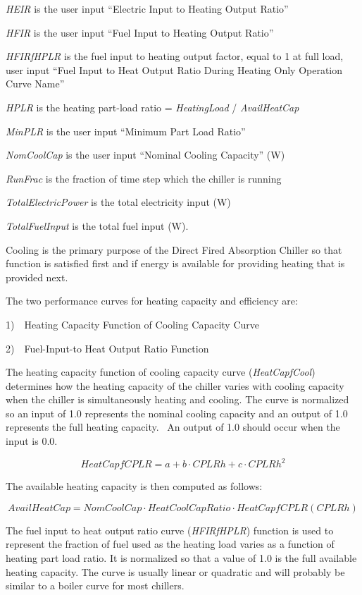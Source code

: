 \emph{HEIR} is the user input ``Electric Input to Heating Output Ratio''

\emph{HFIR} is the user input ``Fuel Input to Heating Output Ratio''

\emph{HFIRfHPLR} is the fuel input to heating output factor, equal to 1 at full load, user input ``Fuel Input to Heat Output Ratio During Heating Only Operation Curve Name''

\emph{HPLR} is the heating part-load ratio = \emph{HeatingLoad} / \emph{AvailHeatCap}

\emph{MinPLR} is the user input ``Minimum Part Load Ratio''

\emph{NomCoolCap} is the user input ``Nominal Cooling Capacity'' (W)

\emph{RunFrac} is the fraction of time step which the chiller is running

\emph{TotalElectricPower} is the total electricity input (W)

\emph{TotalFuelInput} is the total fuel input (W).

Cooling is the primary purpose of the Direct Fired Absorption Chiller so that function is satisfied first and if energy is available for providing heating that is provided next.

The two performance curves for heating capacity and efficiency are:

1)~~Heating Capacity Function of Cooling Capacity Curve

2)~~Fuel-Input-to Heat Output Ratio Function

The heating capacity function of cooling capacity curve (\emph{HeatCapfCool}) determines how the heating capacity of the chiller varies with cooling capacity when the chiller is simultaneously heating and cooling. The curve is normalized so an input of 1.0 represents the nominal cooling capacity and an output of 1.0 represents the full heating capacity.~ An output of 1.0 should occur when the input is 0.0.

\begin{equation}
HeatCapfCPLR = a + b \cdot CPLRh + c \cdot CPLR{h^2}
\end{equation}

The available heating capacity is then computed as follows:

\begin{equation}
AvailHeatCap = NomCoolCap \cdot HeatCoolCapRatio \cdot HeatCapfCPLR(CPLRh)
\end{equation}

The fuel input to heat output ratio curve (\emph{HFIRfHPLR}) function is used to represent the fraction of fuel used as the heating load varies as a function of heating part load ratio. It is normalized so that a value of 1.0 is the full available heating capacity. The curve is usually linear or quadratic and will probably be similar to a boiler curve for most chillers.

